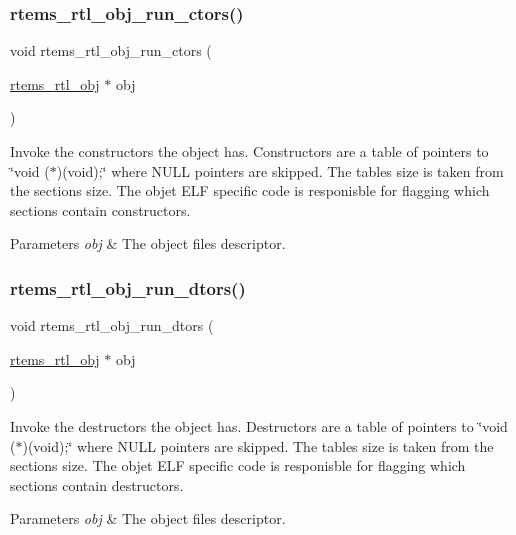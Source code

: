 \subsubsection{\texorpdfstring{rtems\_rtl\_obj\_run\_ctors()}{rtems\_rtl\_obj\_run\_ctors()}}
{\footnotesize\ttfamily void rtems\+\_\+rtl\+\_\+obj\+\_\+run\+\_\+ctors (\begin{DoxyParamCaption}\item[{\mbox{\hyperlink{structrtems__rtl__obj}{rtems\+\_\+rtl\+\_\+obj}} $\ast$}]{obj }\end{DoxyParamCaption})}

Invoke the constructors the object has. Constructors are a table of pointers to \char`\"{}void ($\ast$)(void);\char`\"{} where N\+U\+LL pointers are skipped. The table\textquotesingle{}s size is taken from the section\textquotesingle{}s size. The objet E\+LF specific code is responisble for flagging which sections contain constructors.


\begin{DoxyParams}{Parameters}
{\em obj} & The object file\textquotesingle{}s descriptor. \\
\hline
\end{DoxyParams}
\mbox{\label{rtl-obj_8h_a4c2ee2202085fecf74954e175a0fb7e3}} 
\subsubsection{\texorpdfstring{rtems\_rtl\_obj\_run\_dtors()}{rtems\_rtl\_obj\_run\_dtors()}}
{\footnotesize\ttfamily void rtems\+\_\+rtl\+\_\+obj\+\_\+run\+\_\+dtors (\begin{DoxyParamCaption}\item[{\mbox{\hyperlink{structrtems__rtl__obj}{rtems\+\_\+rtl\+\_\+obj}} $\ast$}]{obj }\end{DoxyParamCaption})}

Invoke the destructors the object has. Destructors are a table of pointers to \char`\"{}void ($\ast$)(void);\char`\"{} where N\+U\+LL pointers are skipped. The table\textquotesingle{}s size is taken from the section\textquotesingle{}s size. The objet E\+LF specific code is responisble for flagging which sections contain destructors.


\begin{DoxyParams}{Parameters}
{\em obj} & The object file\textquotesingle{}s descriptor. \\
\hline
\end{DoxyParams}
\mbox{\label{rtl-obj_8h_a98c2a1b1a67add778c0b4017976f91c3}} 
